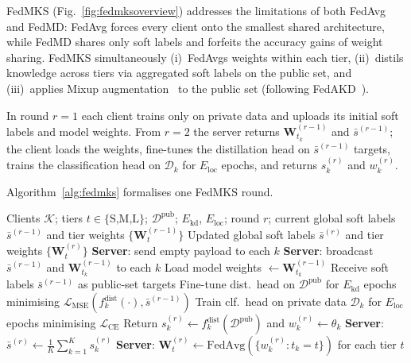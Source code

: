 \documentclass[conference]{IEEEtran}
\begin{document}
FedMKS (Fig.~\ref{fig:fedmksoverview}) addresses the limitations of both
FedAvg and FedMD: FedAvg forces every client onto the smallest shared
architecture, while FedMD shares only soft labels and forfeits the
accuracy gains of weight sharing.  FedMKS simultaneously (i)~FedAvgs
weights within each tier, (ii)~distils knowledge across tiers via
aggregated soft labels on the public set, and (iii)~applies Mixup
augmentation~\cite{zhang2018mixup} to the public set
(following FedAKD~\cite{gad2023fedakd}).

In round $r{=}1$ each client trains only on private data and uploads its
initial soft labels and model weights.  From $r{=}2$ the server returns
$\mathbf{W}_{t_k}^{(r-1)}$ and $\bar{s}^{(r-1)}$; the client loads the
weights, fine-tunes the distillation head on $\bar{s}^{(r-1)}$ targets,
trains the classification head on $\mathcal{D}_k$ for $E_{\text{loc}}$
epochs, and returns $s_k^{(r)}$ and $w_k^{(r)}$.

Algorithm~\ref{alg:fedmks} formalises one FedMKS round.

\begin{algorithm}[t]
\small
\caption{FedMKS --- one communication round}
\label{alg:fedmks}
\begin{algorithmic}[1]
\Require Clients $\mathcal{K}$; tiers $t{\in}\{\text{S,M,L}\}$;
  $\mathcal{D}^{\text{pub}}$; $E_{\text{kd}}$, $E_{\text{loc}}$; round $r$;
  current global soft labels $\bar{s}^{(r-1)}$ and tier weights $\{\mathbf{W}_t^{(r-1)}\}$
\Ensure Updated global soft labels $\bar{s}^{(r)}$ and tier weights $\{\mathbf{W}_t^{(r)}\}$
  \State\textbf{Server}: send empty payload to each $k$  
\Else
  \State\textbf{Server}: broadcast $\bar{s}^{(r-1)}$ and $\mathbf{W}_{t_k}^{(r-1)}$ to each $k$
\EndIf
{}
    \State Load model weights $\gets \mathbf{W}_{t_k}^{(r-1)}$
    \State Receive soft labels $\bar{s}^{(r-1)}$ as public-set targets
    \State Fine-tune dist.\ head on $\mathcal{D}^{\text{pub}}$ for $E_{\text{kd}}$ epochs
           minimising $\mathcal{L}_{\text{MSE}}(f_k^{\text{dist}}(\cdot), \bar{s}^{(r-1)})$
  \EndIf
  \State Train clf.\ head on private data $\mathcal{D}_k$ for $E_{\text{loc}}$ epochs
         minimising $\mathcal{L}_{\text{CE}}$
  \State Return $s_k^{(r)} \gets f_k^{\text{dist}}(\mathcal{D}^{\text{pub}})$
         and $w_k^{(r)} \gets \theta_k$
\EndFor
\State \textbf{Server}: $\bar{s}^{(r)} \gets \tfrac{1}{K}\sum_{k=1}^{K} s_k^{(r)}$
\State \textbf{Server}: $\mathbf{W}_t^{(r)} \gets \mathrm{FedAvg}(\{w_k^{(r)} : t_k{=}t\})$
  for each tier $t$
\end{algorithmic}
\end{algorithm}
\end{document}

